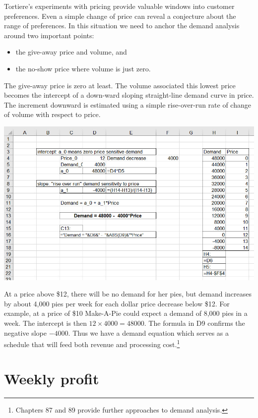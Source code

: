 \documentclass[
]{book}
\begin{document}
Tortiere's experiments with pricing provide valuable windows into customer preferences. Even a simple change of price can reveal a conjecture about the range of preferences. In this situation we need to anchor the demand analysis around two important points:

\begin{itemize}
\item
  the give-away price and volume, and
\item
  the no-show price where volume is just zero.
\end{itemize}

The give-away price is zero at least. The volume associated this lowest price becomes the intercept of a down-ward sloping straight-line demand curve in price. The increment downward is estimated using a simple rise-over-run rate of change of volume with respect to price.

\includegraphics{images/01/pie-demand-analysis.jpg}

At a price above \$12, there will be no demand for her pies, but demand increases by about 4,000 pies per week for each dollar price decrease below \$12. For example, at a price of \$10 Make-A-Pie could expect a demand of 8,000 pies in a week. The intercept is then \(12 \times 4000 = 48000\). The formula in D9 confirms the negative slope \(-4000\). Thus we have a demand equation which serves as a schedule that will feed both revenue and processing cost.\footnote{\citet{Winston2019} Chapters 87 and 89 provide further approaches to demand analysis.}

\hypertarget{weekly-profit}{%
\section{Weekly profit}\label{weekly-profit}}
\end{document}
